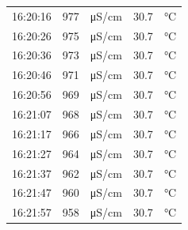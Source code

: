 \documentclass[11pt]{article}
\begin{document}
\begin{enumerate}
\begin{center}
\begin{tabular}{rrlrl}
16:20:16 & 977 & μS/cm & 30.7 & °C\\
16:20:26 & 975 & μS/cm & 30.7 & °C\\
16:20:36 & 973 & μS/cm & 30.7 & °C\\
16:20:46 & 971 & μS/cm & 30.7 & °C\\
16:20:56 & 969 & μS/cm & 30.7 & °C\\
16:21:07 & 968 & μS/cm & 30.7 & °C\\
16:21:17 & 966 & μS/cm & 30.7 & °C\\
16:21:27 & 964 & μS/cm & 30.7 & °C\\
16:21:37 & 962 & μS/cm & 30.7 & °C\\
16:21:47 & 960 & μS/cm & 30.7 & °C\\
16:21:57 & 958 & μS/cm & 30.7 & °C\\
\end{tabular}
\end{center}


\end{enumerate}
\end{document}
